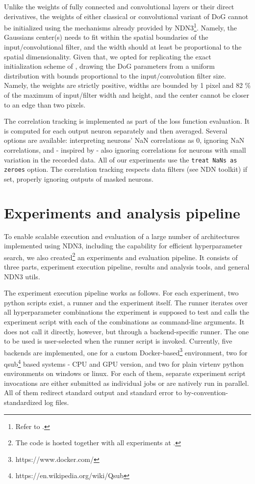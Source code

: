 Unlike the weights of fully connected and convolutional layers or their direct derivatives, the weights of either classical or convolutional variant of DoG cannot be initialized using the mechanisms already provided by NDN3\footnote{Refer to .}. Namely, the Gaussians center(s) needs to fit within the spatial boundaries of the input/convolutional filter, and the width should at least be proportional to the spatial dimensionality. Given that, we opted for replicating the exact initialization scheme of \citeauthor{antolik}, drawing the DoG parameters from a uniform distribution with bounds proportional to the input/convolution filter size. Namely, the weights are strictly positive, widths are bounded by 1 pixel and 82 \% of the maximum of input/filter width and height, and the center cannot be closer to an edge than two pixels. 

The correlation tracking is implemented as part of the loss function evaluation. It is computed for each output neuron separately and then averaged. Several options are available: interpreting neurons’ NaN correlations as 0, ignoring NaN correlations, and - inspired by \cite{ecker} - also ignoring correlations for neurons with small variation in the recorded data. All of our experiments use the \texttt{treat NaNs as zeroes} option. The correlation tracking respects data filters (see NDN toolkit) if set, properly ignoring outputs of masked neurons.

\section{Experiments and analysis pipeline}\label{ch:3.3}

To enable scalable execution and evaluation of a large number of architectures implemented using NDN3, including the capability for efficient hyperparameter search, we also created\footnote{The code is hosted together with all experiments at .} an experiments and evaluation pipeline. It consists of three parts, experiment execution pipeline, results and analysis tools, and general NDN3 utils.

The experiment execution pipeline works as follows. For each experiment, two python scripts exist, a runner and the experiment itself. The runner iterates over all hyperparameter combinations the experiment is supposed to test and calls the experiment script with each of the combinations as command-line arguments. It does not call it directly, however, but through a backend-specific runner. The one to be used is user-selected when the runner script is invoked. Currently, five backends are implemented, one for a custom Docker-based\footnote{https://www.docker.com/} environment, two for qsub\footnote{https://en.wikipedia.org/wiki/Qsub} based systems - CPU and GPU version, and two for plain virtenv python environments on windows or linux. For each of them, separate experiment script invocations are either submitted as individual jobs or are natively run in parallel. All of them redirect standard output and standard error to by-convention-standardized log files.

